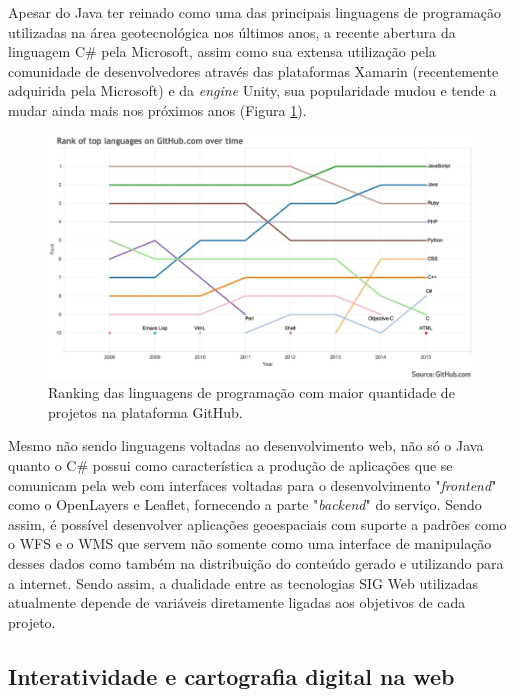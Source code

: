 		Apesar do Java ter reinado como uma das principais linguagens de programação utilizadas na área geotecnológica nos últimos anos, a recente abertura da linguagem C\# pela Microsoft, assim como sua extensa utilização pela comunidade de desenvolvedores através das plataformas Xamarin (recentemente adquirida pela Microsoft) e da \textit{engine} Unity, sua popularidade mudou e tende a mudar ainda mais nos próximos anos (Figura \ref{fig:rankinggithub}).
		
		\begin{figure}
			\centering
			\includegraphics[width=1\linewidth]{data/ranking_github}
			\caption{Ranking das linguagens de programação com maior quantidade de projetos na plataforma GitHub.}
			\label{fig:rankinggithub}
		\end{figure}
		
		Mesmo não sendo linguagens voltadas ao desenvolvimento web, não só o Java quanto o C\# possui como característica a produção de aplicações que se comunicam pela web com interfaces voltadas para o desenvolvimento "\textit{frontend}" como o OpenLayers e Leaflet, fornecendo a parte "\textit{backend}" do serviço. Sendo assim, é possível desenvolver aplicações geoespaciais com suporte a padrões como o WFS e o WMS que servem não somente como uma interface de manipulação desses dados como também na distribuição do conteúdo gerado e utilizando para a internet. Sendo assim, a dualidade entre as tecnologias SIG Web utilizadas atualmente depende de variáveis diretamente ligadas aos objetivos de cada projeto.
		
		\subsection{Interatividade e cartografia digital na web}
		
